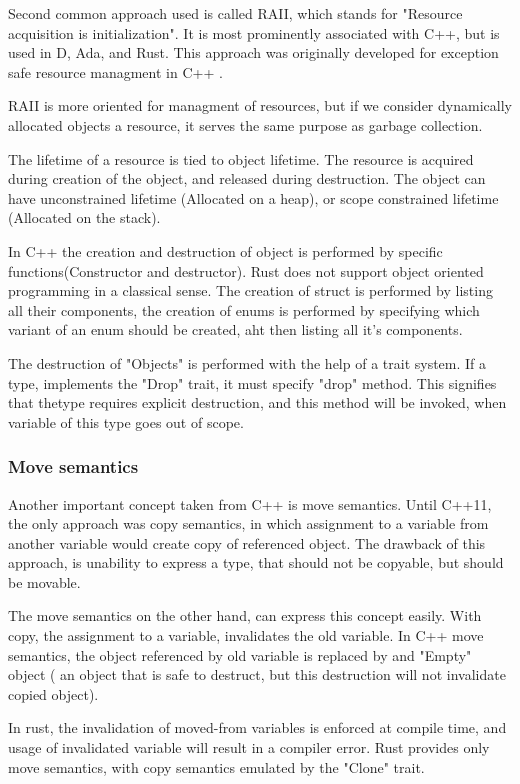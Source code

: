 Second common approach used is called RAII, which stands for "Resource acquisition is initialization". It is most
prominently associated with C++, but is used in D, Ada, and Rust. This approach was originally developed for exception safe
resource managment in C++ .

RAII is more oriented for managment of resources, but if we consider dynamically allocated objects a resource, it serves
the same purpose as garbage collection.

The lifetime of a resource is tied to object lifetime. The resource is acquired during creation of the object,
and released during destruction. The object can have unconstrained lifetime (Allocated on a heap), or scope constrained
lifetime (Allocated on the stack).

In C++ the creation and destruction of object is performed by specific functions(Constructor and destructor). Rust does
not support object oriented programming in a classical sense. The creation of struct is performed by listing all
their components, the creation of enums is performed by specifying which variant of an enum should be created, aht
then listing all it's components.

The destruction of "Objects" is performed with the help of a trait system. If a type, implements the "Drop" trait, it must
specify "drop" method. This signifies that thetype requires explicit destruction, and this method will
be invoked, when variable of this type goes out of scope.

\subsubsection{Move semantics}
Another important concept taken from C++ is move semantics. Until C++11, the only approach was copy semantics, in which
assignment to a variable from another variable would create copy of referenced object.
The drawback of this approach, is unability to express a type, that should not be copyable, but should be movable.

The move semantics on the other hand, can express this concept easily. With copy, the assignment to a variable, invalidates the
old variable. In C++ move semantics, the object referenced by old variable is replaced by and "Empty" object ( an object
that is safe to destruct, but this destruction will not invalidate copied object).

In rust, the invalidation of moved-from variables is enforced at compile time, and usage of invalidated variable will result in a
compiler error. Rust provides only move semantics, with copy semantics emulated by the "Clone" trait.

